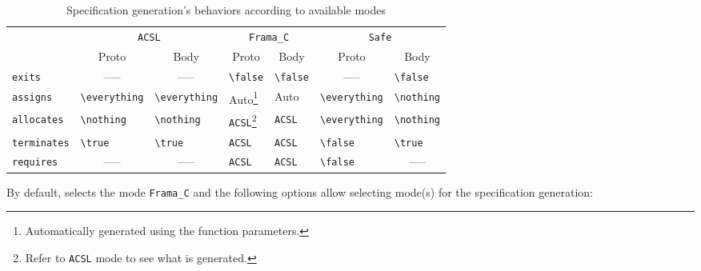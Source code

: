 \begin{table}[t]
  \begin{minipage}{\linewidth}
    \begin{tabular}{@{}l|ll|ll|ll@{}}
      \multicolumn{1}{c|}{ \multirow{2}{*}{Mode}}
      & \multicolumn{2}{c|}{\texttt{ACSL}}
      & \multicolumn{2}{c|}{\texttt{Frama\_C}}
      & \multicolumn{2}{c}{\texttt{Safe}} \\

      & \multicolumn{1}{c}{Proto}  & \multicolumn{1}{c|}{Body}
      &  \multicolumn{1}{c}{Proto} & \multicolumn{1}{c|}{Body}
      &  \multicolumn{1}{c}{Proto} & \multicolumn{1}{c}{Body} \\ \midrule

      \texttt{exits}        & \multicolumn{1}{c}{-----}     & \multicolumn{1}{c|}{-----}
                            & \verb+\false+                 & \verb+\false+
                            & \multicolumn{1}{c}{-----}     & \verb+\false+ \\
      \texttt{assigns}      & \verb+\everything+            & \verb+\everything+
                            & Auto\footnote{Automatically generated using the function parameters.} & Auto
                            & \verb+\everything+            & \verb+\nothing+ \\
      \texttt{allocates}    & \verb+\nothing+               & \verb+\nothing+
                            & \texttt{ACSL}\footnote{Refer to \texttt{ACSL} mode to see what is generated.} & \texttt{ACSL}
                            & \verb+\everything+            & \verb+\nothing+ \\
      \texttt{terminates}   & \verb+\true+                  & \verb+\true+
                            & \texttt{ACSL}                 & \texttt{ACSL}
                            & \verb+\false+                 & \verb+\true+ \\
      \texttt{requires}     & \multicolumn{1}{c}{-----}     & \multicolumn{1}{c|}{-----}
                            & \texttt{ACSL}                 & \texttt{ACSL}
                            & \verb+\false+                 & \multicolumn{1}{c}{-----} \\
    \end{tabular}
  \end{minipage}
  \caption{Specification generation's behaviors according to available modes}
  \label{table:populate-mode}
\end{table}

By default, \FramaC selects the mode \texttt{Frama\_C} and the following options
allow selecting mode(s) for the specification generation:

